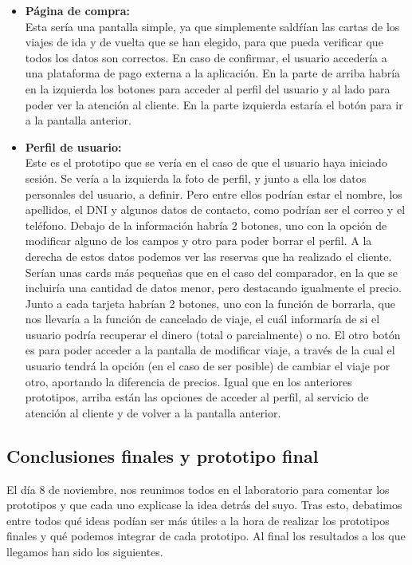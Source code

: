 \begin{itemize}
    \item\textbf{Página de compra:} \\ Esta sería una pantalla simple, ya que simplemente saldŕían las cartas de los viajes de ida y de vuelta que se han elegido, para que pueda verificar que todos los datos son correctos. En caso de confirmar, el usuario accedería a una plataforma de pago externa a la aplicación. En la parte de arriba habría en la izquierda los botones para acceder al perfil del usuario y al lado para poder ver la atención al cliente. En la parte izquierda estaría el botón para ir a la pantalla anterior.
    \item\textbf{Perfil de usuario:} \\ Este es el prototipo que se vería en el caso de que el usuario haya iniciado sesión. Se vería a la izquierda la foto de perfil, y junto a ella los datos personales del usuario, a definir. Pero entre ellos podrían estar el nombre, los apellidos, el DNI y algunos datos de contacto, como podrían ser el correo y el teléfono. Debajo de la información habría 2 botones, uno con la opción de modificar alguno de los campos y otro para poder borrar el perfil. A la derecha de estos datos podemos ver las reservas que ha realizado el cliente. Serían unas cards más pequeñas que en el caso del comparador, en la que se incluiría una cantidad de datos menor, pero destacando igualmente el precio. Junto a cada tarjeta habrían 2 botones, uno con la función de borrarla, que nos llevaría a la función de cancelado de viaje, el cuál informaría de si el usuario podría recuperar el dinero (total o parcialmente) o no. El otro botón es para poder acceder a la pantalla de modificar viaje, a través de la cual el usuario tendrá la opción (en el caso de ser posible) de cambiar el viaje por otro, aportando la diferencia de precios. Igual que en los anteriores prototipos, arriba están las opciones de acceder al perfil, al servicio de atención al cliente y de volver a la pantalla anterior.
    
\end{itemize}

\subsection{Conclusiones finales y prototipo final}

El día 8 de noviembre, nos reunimos todos en el laboratorio para comentar los prototipos y que cada uno explicase
la idea detrás del suyo. Tras esto, debatimos entre todos qué ideas podían ser más útiles a la hora de realizar los prototipos
finales y qué podemos integrar de cada prototipo. Al final los resultados a los que llegamos han sido los siguientes.

